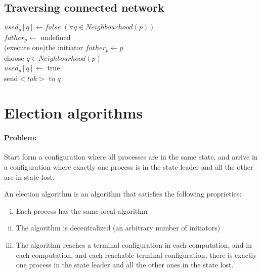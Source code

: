 \subsection{Traversing connected network}

\begin{algorithm}[H]
$used_p[q]\leftarrow false\; (\forall q \in Neighbourhood(p))$\\
$father_p \leftarrow$ undefined\\
\For(execute one){the initiator}{
	$father_p \leftarrow p$\\
	choose $q\in Neighbourhood(p)$\\
	$used_p[q]\leftarrow$ true\\
	send$<tok>$ to $q$\\
}
\end{algorithm}

\section{Election algorithms}


\paragraph{Problem:} Start form a configuration where all processes are in the same state, and arrive in a configuration where exactly one process is in the state leader and all the other are in state lost.

\begin{defi}
An election algorithm is an algorithm that satisfies the following proprieties:

\begin{enumerate}[i.]
\item Each process has the same local algorithm
\item The algorithm is decentralized (an arbitrary number of initiators)
\item The algorithm reaches a terminal configuration in each computation, and in each computation, and each reachable terminal configuration, there is exactly one process in the state leader and all the other ones in the state lost.
\end{enumerate}
\end{defi}

